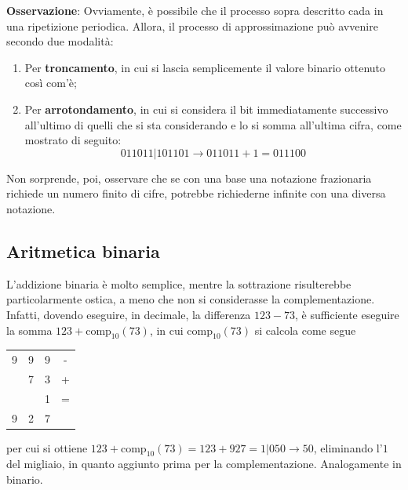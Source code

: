 \documentclass[a4paper]{extarticle}
\renewcommand\arraystretch{}
\begin{document}
\vspace{1em}
\noindent
\textbf{Osservazione}: Ovviamente, è possibile che il processo sopra descritto cada in una ripetizione periodica. Allora, il processo di approssimazione può avvenire secondo due modalità:
\begin{enumerate}
    \item Per \textbf{troncamento}, in cui si lascia semplicemente il valore binario ottenuto così com'è;
    \item Per \textbf{arrotondamento}, in cui si considera il bit immediatamente successivo all'ultimo di quelli che si sta considerando e lo si somma all'ultima cifra, come mostrato di seguito:
    \[011011 \vert \boxed{1}01101 \rightarrow 011011+\boxed{1}=011100\]
\end{enumerate}
Non sorprende, poi, osservare che se con una base una notazione frazionaria richiede un numero finito di cifre, potrebbe richiederne infinite con una diversa notazione.

\vspace{1em}
\noindent
\subsection{Aritmetica binaria}
L'addizione binaria è molto semplice, mentre la sottrazione risulterebbe particolarmente ostica, a meno che non si considerasse la complementazione. Infatti, dovendo eseguire, in decimale, la differenza $123-73$, è sufficiente eseguire la somma $123+\text{comp}_{10}(73)$, in cui $\text{comp}_{10}(73)$ si calcola come segue

\vspace{1em}
\noindent
\begin{table}[H]
\setlength{\tabcolsep}{4pt}
\renewcommand{\arraystretch}{1.2}
\centering
\begin{tabular}{cccc}
    9 & 9 & 9 & -\\
      & 7 & 3 & +\\
      &   & 1 & =\\
    \hline
    9 & 2 & 7
\end{tabular}
\end{table}
\vspace{1em}

\noindent
per cui si ottiene $123+\text{comp}_{10}(73)=123+927=1 \vert 050 \rightarrow 50$, eliminando l'$1$ del migliaio, in quanto aggiunto prima per la complementazione. Analogamente in binario.
\end{document}
